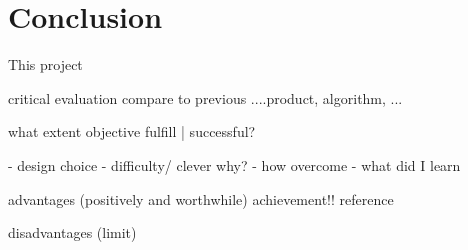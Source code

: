 \chapter{Conclusion}

This project

critical evaluation compare to previous ....product, algorithm, ...

what extent objective fulfill |  successful?

 - design choice 
 - difficulty/ clever why?
 - how overcome 
 - what did I learn

advantages (positively and worthwhile) achievement!!  reference 

disadvantages (limit)
